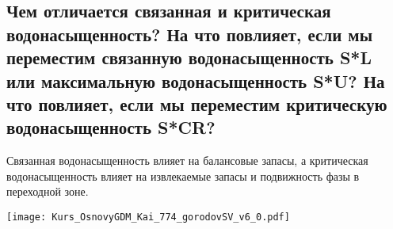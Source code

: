

\subsection{Чем отличается связанная и критическая водонасыщенность? На что повлияет, если мы переместим связанную водонасыщенность S*L или максимальную водонасыщенность S*U? На что повлияет, если мы переместим критическую водонасыщенность S*CR?}

Связанная водонасыщенность влияет на балансовые запасы, а критическая водонасыщенность влияет на извлекаемые запасы и подвижность фазы в переходной зоне.

\texttt{[image: Kurs\_OsnovyGDM\_Kai\_774\_gorodovSV\_v6\_0.pdf]}

